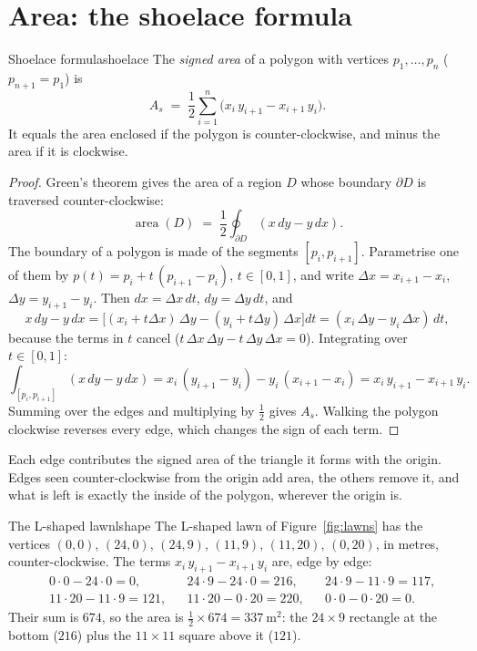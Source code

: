 \section{Area: the shoelace formula}

\begin{proposition}{Shoelace formula}{shoelace}
  The \emph{signed area} of a polygon with vertices $p_1, \dots, p_n$
  ($p_{n+1} = p_1$) is
  \[
    A_s \;=\; \frac12 \sum_{i=1}^{n} \bigl(x_i\,y_{i+1} - x_{i+1}\,y_i\bigr).
  \]
  It equals the area enclosed if the polygon is counter-clockwise, and minus
  the area if it is clockwise.
\end{proposition}

\begin{proof}
  Green's theorem gives the area of a region $D$ whose boundary $\partial D$
  is traversed counter-clockwise:
  \[
    \operatorname{area}(D) \;=\; \frac12 \oint_{\partial D} (x\,dy - y\,dx).
  \]
  The boundary of a polygon is made of the segments $[p_i, p_{i+1}]$.
  Parametrise one of them by
  $p(t) = p_i + t\,(p_{i+1} - p_i)$, $t \in [0, 1]$, and write
  $\Delta x = x_{i+1} - x_i$, $\Delta y = y_{i+1} - y_i$. Then
  $dx = \Delta x\,dt$, $dy = \Delta y\,dt$, and
  \[
    x\,dy - y\,dx
    = \bigl[(x_i + t\Delta x)\,\Delta y - (y_i + t\Delta y)\,\Delta x\bigr]dt
    = (x_i\,\Delta y - y_i\,\Delta x)\,dt,
  \]
  because the terms in $t$ cancel ($t\,\Delta x\,\Delta y -
  t\,\Delta y\,\Delta x = 0$). Integrating over $t \in [0, 1]$:
  \[
    \int_{[p_i, p_{i+1}]} (x\,dy - y\,dx)
    = x_i\,(y_{i+1} - y_i) - y_i\,(x_{i+1} - x_i)
    = x_i\,y_{i+1} - x_{i+1}\,y_i .
  \]
  Summing over the edges and multiplying by $\tfrac12$ gives $A_s$. Walking
  the polygon clockwise reverses every edge, which changes the sign of each
  term.
\end{proof}

\begin{inwords}
  Each edge contributes the signed area of the triangle it forms with the
  origin. Edges seen counter-clockwise from the origin add area, the others
  remove it, and what is left is exactly the inside of the polygon, wherever
  the origin is.
\end{inwords}

\begin{example}{The L-shaped lawn}{lshape}
  The L-shaped lawn of Figure~\ref{fig:lawns} has the vertices
  $(0, 0)$, $(24, 0)$, $(24, 9)$, $(11, 9)$, $(11, 20)$, $(0, 20)$, in metres,
  counter-clockwise. The terms $x_i\,y_{i+1} - x_{i+1}\,y_i$ are, edge by
  edge:
  \begin{align*}
    &0 \cdot 0 - 24 \cdot 0 = 0, &
    &24 \cdot 9 - 24 \cdot 0 = 216, &
    &24 \cdot 9 - 11 \cdot 9 = 117, \\
    &11 \cdot 20 - 11 \cdot 9 = 121, &
    &11 \cdot 20 - 0 \cdot 20 = 220, &
    &0 \cdot 0 - 0 \cdot 20 = 0 .
  \end{align*}
  Their sum is $674$, so the area is $\tfrac12 \times 674 =
  \SI{337}{\metre\squared}$: the $24 \times 9$ rectangle at the bottom
  ($216$) plus the $11 \times 11$ square above it ($121$).
\end{example}

